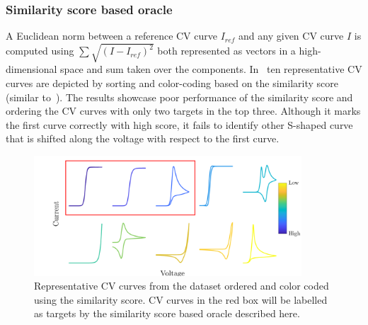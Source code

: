 \subsubsection{Similarity score based oracle}
A Euclidean norm between a reference CV curve \(I_{ref}\) and any given CV curve \(I\) is computed using \(\sum \sqrt{(I - I_{ref})^2}\) both represented as vectors in a high-dimensional space and sum taken over the components. 
In~ ten representative CV curves are depicted by sorting and color-coding based on the similarity score (similar to~). 
The results showcase poor performance of the similarity score and ordering the CV curves with only two targets in the top three.
Although it marks the first curve correctly with high score, it fails to identify other S-shaped curve that is shifted along the voltage with respect to the first curve.
\begin{figure}[h]
    \centering
    \includegraphics[width=100mm]{Chapter-3/figures/repsimscorespectrum.png}
    \caption{Representative CV curves from the dataset ordered and color coded using the similarity score. CV curves in the red box will be labelled as targets by the similarity score based oracle described here.}
    \label{figSI:repssscores}
\end{figure}

